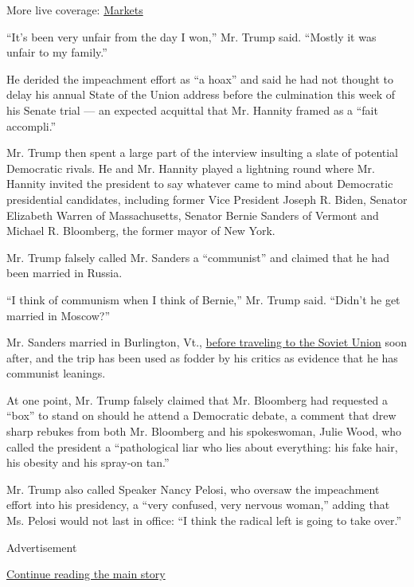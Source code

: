 More live coverage:
\href{https://www.nytimes3xbfgragh.onion/live/2020/09/09/business/stock-market-today-coronavirus?action=click\&pgtype=Article\&state=default\&region=MAIN_CONTENT_1\&context=storylines_live_updates}{Markets}

``It's been very unfair from the day I won,'' Mr. Trump said. ``Mostly
it was unfair to my family.''

He derided the impeachment effort as ``a hoax'' and said he had not
thought to delay his annual State of the Union address before the
culmination this week of his Senate trial --- an expected acquittal that
Mr. Hannity framed as a ``fait accompli.''

Mr. Trump then spent a large part of the interview insulting a slate of
potential Democratic rivals. He and Mr. Hannity played a lightning round
where Mr. Hannity invited the president to say whatever came to mind
about Democratic presidential candidates, including former Vice
President Joseph R. Biden, Senator Elizabeth Warren of Massachusetts,
Senator Bernie Sanders of Vermont and Michael R. Bloomberg, the former
mayor of New York.

Mr. Trump falsely called Mr. Sanders a ``communist'' and claimed that he
had been married in Russia.

``I think of communism when I think of Bernie,'' Mr. Trump said.
``Didn't he get married in Moscow?''

Mr. Sanders married in Burlington, Vt.,
\href{https://www.washingtonpost.com/politics/inside-bernie-sanderss-1988-10-day-honeymoon-in-the-soviet-union/2019/05/02/db543e18-6a9c-11e9-a66d-a82d3f3d96d5_story.html}{before
traveling to the Soviet Union} soon after, and the trip has been used as
fodder by his critics as evidence that he has communist leanings.

At one point, Mr. Trump falsely claimed that Mr. Bloomberg had requested
a ``box'' to stand on should he attend a Democratic debate, a comment
that drew sharp rebukes from both Mr. Bloomberg and his spokeswoman,
Julie Wood, who called the president a ``pathological liar who lies
about everything: his fake hair, his obesity and his spray-on tan.''

Mr. Trump also called Speaker Nancy Pelosi, who oversaw the impeachment
effort into his presidency, a ``very confused, very nervous woman,''
adding that Ms. Pelosi would not last in office: ``I think the radical
left is going to take over.''

Advertisement

\protect\hyperlink{after-bottom}{Continue reading the main story}

